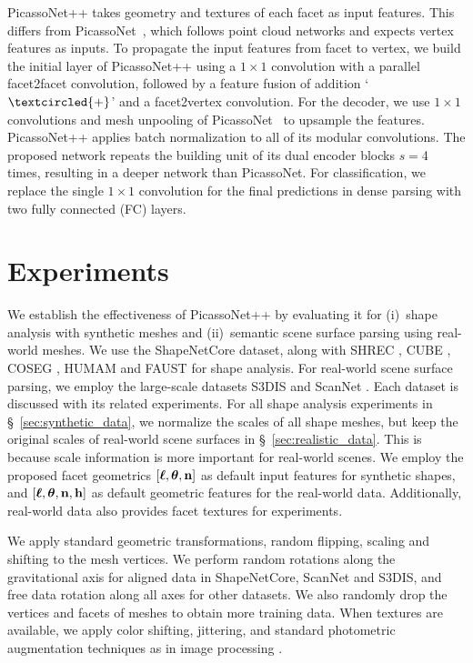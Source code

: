 {\color{black}
PicassoNet++ takes geometry and textures of each facet as input features. This differs from PicassoNet~\cite{lei2021picasso}, which follows point cloud networks and expects vertex features as inputs.
To propagate the input features from facet to vertex, we build the initial layer of PicassoNet++ using a $1{\times}1$ convolution with a parallel facet2facet convolution, followed by a feature fusion of addition `$\textcircled{+}$' and a facet2vertex convolution. 
For the decoder, we use  $1{\times}1$ convolutions and mesh unpooling of PicassoNet~\cite{lei2021picasso} to upsample the features. PicassoNet++ applies batch normalization to all of its modular convolutions. 
The proposed network repeats the building unit of its dual encoder blocks $s{=}$4 times, resulting in a deeper network than PicassoNet. For classification, we replace the single $1{\times}1$ convolution for the final predictions in dense parsing with two fully connected (FC) layers. 
}

\section{Experiments}\label{sec:experiment}
We establish the effectiveness of PicassoNet++ by evaluating it for (i)~shape analysis with synthetic meshes and (ii)~semantic scene surface parsing using real-world meshes. We use the 
ShapeNetCore \cite{chang2015shapenet} dataset, along with SHREC \cite{lian2011shape}, CUBE \cite{hanocka2019meshcnn}, COSEG \cite{wang2012active}, HUMAM \cite{maron2017convolutional} and FAUST \cite{bogo2014faust} 
for shape analysis. 
For real-world scene surface parsing, we employ the large-scale datasets S3DIS \cite{armeni20163d} and ScanNet \cite{dai2017scannet}. 
Each dataset is discussed with its related experiments. 
For all shape analysis experiments in \S~\ref{sec:synthetic_data}, we normalize the scales of all shape meshes, but keep the original scales of real-world scene surfaces in \S~\ref{sec:realistic_data}. 
This is because scale information is more important for real-world scenes. 
We employ the proposed facet geometrics $[{\boldsymbol \ell}, {\boldsymbol \theta}, {\bf n}]$ as default  input features for synthetic shapes, and $[{\boldsymbol \ell}, {\boldsymbol \theta}, {\bf n}, {\bf h}]$ as default geometric features for the real-world data. Additionally, real-world data also provides facet textures for experiments.

\vspace{1mm}
 We apply standard geometric transformations, \eg random flipping, scaling and shifting to the mesh vertices. We perform random rotations along the gravitational axis for aligned data in ShapeNetCore, ScanNet and S3DIS, and free data rotation  along all axes for other datasets. We also randomly drop the vertices and facets of meshes to obtain more training data. 
When textures are available, we apply color shifting, jittering,
and standard photometric augmentation techniques as in image processing \cite{liu2016ssd,choy20194d}.

